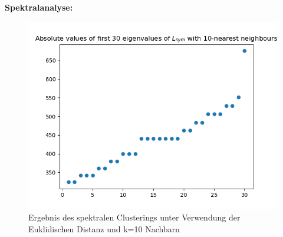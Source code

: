 \documentclass[11pt,a4paper]{article}
\numberwithin{equation}{section}
\begin{document}
	\newpage
	\noindent \textbf{Spektralanalyse:}
	\begin{figure}[h]
		\begin{center}
			\includegraphics[width=0.5\textheight]{specClustering_l2_k10.png}
			\caption{Ergebnis des spektralen Clusterings unter Verwendung der Euklidischen Distanz und k=10 Nachbarn}
		\end{center}
	\end{figure}
	
\end{document}
